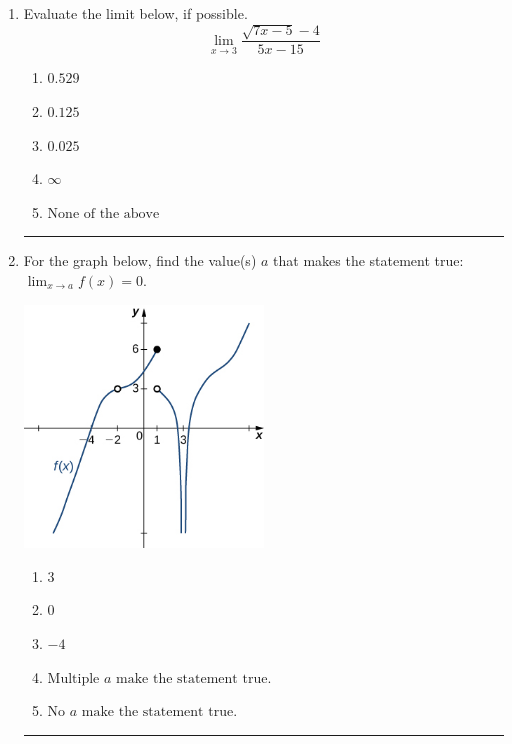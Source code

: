 \documentclass[14pt]{extbook}
\newcommand{\litem}[1]{\item#1\hspace*{-1cm}\rule{\textwidth}{0.4pt}}
\begin{document}
\begin{enumerate}
{\begin{enumerate}[label=\Alph*.]
\end{enumerate} }
\litem{
Evaluate the limit below, if possible.\[ \lim_{x \rightarrow 3} \frac{\sqrt{7x - 5} - 4}{5x - 15} \]\begin{enumerate}[label=\Alph*.]
\item \( 0.529 \)
\item \( 0.125 \)
\item \( 0.025 \)
\item \( \infty \)
\item \( \text{None of the above} \)

\end{enumerate} }
\litem{
For the graph below, find the value(s) $a$ that makes the statement true: $ \displaystyle \lim_{x \rightarrow a} f(x) = 0$.
\begin{center}
    \includegraphics[width=0.5\textwidth]{../Figures/evaluateLimitGraphicallyA.png}
\end{center}
\begin{enumerate}[label=\Alph*.]
\item \( 3 \)
\item \( 0 \)
\item \( -4 \)
\item \( \text{Multiple } a \text{ make the statement true}. \)
\item \( \text{No } a \text{ make the statement true}. \)


\end{enumerate}}
\end{enumerate}
\end{document}
